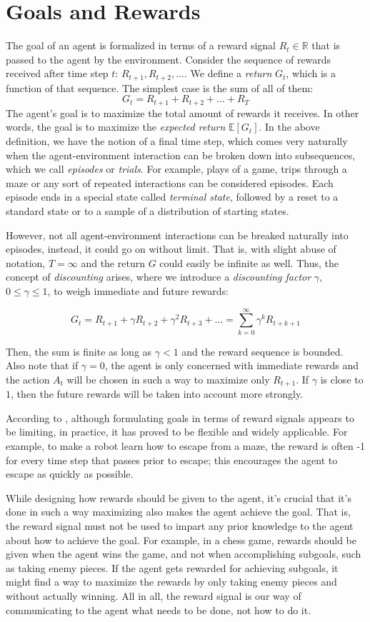 \section{Goals and Rewards}
The goal of an agent is formalized in terms of a reward signal $R_t \in \mathbb{R}$ that is passed to the agent by the environment. Consider the sequence of rewards received after time step $t$: $R_{t+1}, R_{t+2}, \dots$. We define a \textit{return} $G_t$, which is a function of that sequence. The simplest case is the sum of all of them:
\[
    G_t = R_{t+1} + R_{t+2} + \dots + R_T
\]
The agent's goal is to maximize the total amount of rewards it receives. In other words, the goal is to maximize the \textit{expected return} $\mathbb{E}[G_t]$. In the above definition, we have the notion of a final time step, which comes very naturally when the agent-environment interaction can be broken down into subsequences, which we call \textit{episodes} or \textit{trials}. For example, plays of a game, trips through a maze or any sort of repeated interactions can be considered episodes. Each episode ends in a special state called \textit{terminal state}, followed by a reset to a standard state or to a sample of a distribution of starting states.

However, not all agent-environment interactions can be breaked naturally into episodes, instead, it could go on without limit. That is, with slight abuse of notation, $T = \infty$ and the return $G$ could easily be infinite as well. Thus, the concept of \textit{discounting} arises, where we introduce a \textit{discounting factor} $\gamma$, $0 \leq \gamma \leq 1$, to weigh immediate and future rewards:

\[
    G_t = R_{t+1} + \gamma R_{t+2} + \gamma^2 R_{t+3} + \dots = \sum_{k=0}^{\infty}\gamma^k R_{t+k+1}
\]

Then, the sum is finite as long as $\gamma < 1$ and the reward sequence is bounded. Also note that if $\gamma = 0$, the agent is only concerned with immediate rewards and the action $A_t$ will be chosen in such a way to maximize only $R_{t+1}$. If $\gamma$ is close to $1$, then the future rewards will be taken into account more strongly.

According to \cite{suttonbarto}, although formulating goals in terms of reward signals appears to be limiting, in practice, it has proved to be flexible and widely applicable. For example, to make a robot learn how to escape from a maze, the reward is often -1 for every time
step that passes prior to escape; this encourages the agent to escape as quickly as possible.

While designing how rewards should be given to the agent, it's crucial that it's done in such a way maximizing also makes the agent achieve the goal. That is, the reward signal must not be used to impart any prior knowledge to the agent about how to achieve the goal. For example, in a chess game, rewards should be given when the agent wins the game, and not when accomplishing subgoals, such as taking enemy pieces. If the agent gets rewarded for achieving subgoals, it might find a way to maximize the rewards by only taking enemy pieces and without actually winning. All in all, the reward signal is our way of communicating to the agent what needs to be done, not how to do it. 